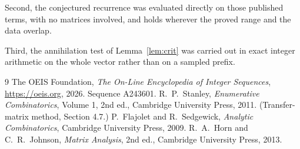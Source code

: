 \documentclass[11pt,a4paper]{article}
\theoremstyle{plain}
\theoremstyle{definition}
\begin{document}
Second, the conjectured recurrence was evaluated directly on those published terms, with no
matrices involved, and holds wherever the proved range and the data overlap.

Third, the annihilation test of Lemma~\ref{lem:crit} was carried out in exact integer
arithmetic on the whole vector rather than on a sampled prefix.

\begin{thebibliography}{9}
 The OEIS Foundation, \emph{The On-Line Encyclopedia of Integer
Sequences}, \url{https://oeis.org}, 2026. Sequence A243601.
 R.~P.~Stanley, \emph{Enumerative Combinatorics}, Volume 1, 2nd ed.,
Cambridge University Press, 2011. (Transfer-matrix method, Section 4.7.)
 P.~Flajolet and R.~Sedgewick, \emph{Analytic Combinatorics}, Cambridge
University Press, 2009.
 R.~A.~Horn and C.~R.~Johnson, \emph{Matrix Analysis}, 2nd ed., Cambridge
University Press, 2013.
\end{thebibliography}
\end{document}

